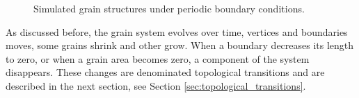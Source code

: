 \begin{figure}[t]
    \centering
    \caption{Simulated grain structures under periodic boundary conditions.}
    \label{fig:grainstructure}
\end{figure}
As discussed before, the grain system evolves over time, vertices and boundaries moves, some grains shrink and other grow. 
When a boundary decreases its length to zero, or when a grain area becomes zero, a component of the system disappears. 
These changes are denominated topological transitions and are described in the next section, see Section \ref{sec:topological_transitions}.

